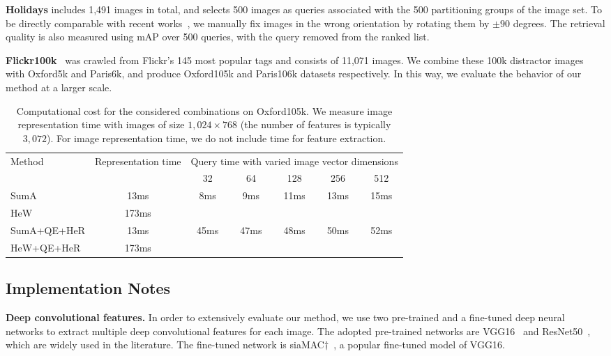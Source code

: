 \documentclass[journal]{IEEEtran}
\begin{document}
\vspace{0.01in}
\textbf{Holidays} includes 1,491 images in total,
and selects 500 images as queries associated with the 500 partitioning groups of the image set. To be directly comparable with recent works~\cite{babenko2015aggregating,kalantidis2016cross,hoang2017selective},
we manually fix images in the wrong orientation by rotating them by $\pm 90$ degrees.
The retrieval quality is also measured using mAP over 500 queries, with the query removed from the ranked list.

\vspace{0.01in}
\textbf{Flickr100k}~\cite{philbin2007object} was crawled from Flickr's 145 most popular tags and consists of 11,071 images.
We combine these 100k distractor images with Oxford5k and Paris6k, and produce Oxford105k and Paris106k datasets respectively.
In this way, we evaluate the behavior of our method at a larger scale.

\begin{table*}[t]
\centering
\caption{Computational cost for the considered combinations on Oxford105k. We measure image representation time with images of size $1,024 \times 768$ (the number of features is typically $3,072$). For image representation time, we do not include time for feature extraction.}\label{times}
\begin{tabular}{|l|c|c c c c c|}
  \hline
  \multirow{2}{*}{Method}&\multirow{2}{*}{Representation time}   & \multicolumn{5}{c|}{Query time with varied image vector dimensions}\\
  \cline{3-7}
  &  &32  &64  &128 &256  &512  \\
  \hline
  SumA&13ms  &\multirow{2}{*}{8ms}  &\multirow{2}{*}{9ms}  &\multirow{2}{*}{11ms} &\multirow{2}{*}{13ms}  &\multirow{2}{*}{15ms}  \\
  HeW &173ms   & & & & & \\
  \hline
  SumA+QE+HeR&13ms &\multirow{2}{*}{45ms} &\multirow{2}{*}{47ms} &\multirow{2}{*}{48ms} &\multirow{2}{*}{50ms}  &\multirow{2}{*}{52ms}  \\
  HeW+QE+HeR&173ms & & & & & \\
  \hline
\end{tabular}
\end{table*}
\subsection{Implementation Notes}

\textbf{Deep convolutional features.} In order to extensively evaluate our method,
we use two pre-trained and a fine-tuned deep neural networks to extract multiple deep convolutional features for each image.
The adopted pre-trained networks are VGG16~\cite{simonyan2014very} and ResNet50~\cite{he2016deep}, which are widely used in the literature.
The fine-tuned network is siaMAC$\dagger$~\cite{radenovic2016cnn}, a popular fine-tuned model of VGG16.
\end{document}
